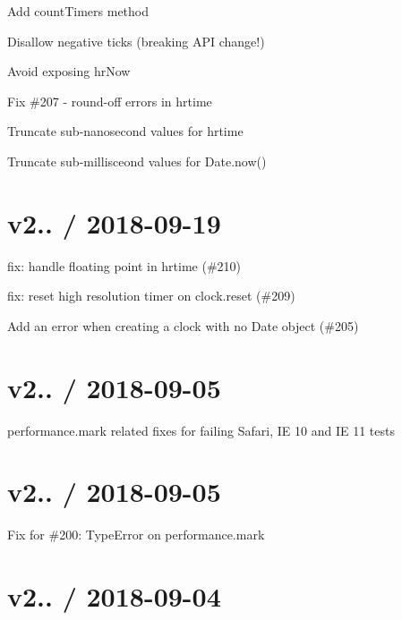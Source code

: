 
\begin{DoxyItemize}
\item Add count\+Timers method
\item Disallow negative ticks (breaking A\+PI change!)
\item Avoid exposing hr\+Now
\item Fix \#207 -\/ round-\/off errors in {\ttfamily hrtime}
\item Truncate sub-\/nanosecond values for {\ttfamily hrtime}
\item Truncate sub-\/millisceond values for {\ttfamily Date.\+now()}
\end{DoxyItemize}

\section*{v2.. / 2018-\/09-\/19 }


\begin{DoxyItemize}
\item fix\+: handle floating point in hrtime (\#210)
\item fix\+: reset high resolution timer on clock.\+reset (\#209)
\item Add an error when creating a clock with no Date object (\#205)
\end{DoxyItemize}

\section*{v2.. / 2018-\/09-\/05 }


\begin{DoxyItemize}
\item performance.\+mark related fixes for failing Safari, IE 10 and IE 11 tests
\end{DoxyItemize}

\section*{v2.. / 2018-\/09-\/05 }


\begin{DoxyItemize}
\item Fix for \#200\+: Type\+Error on performance.\+mark
\end{DoxyItemize}

\section*{v2.. / 2018-\/09-\/04 }


